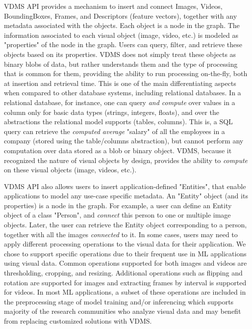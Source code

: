 VDMS API provides a mechanism to insert and connect Images, Videos, BoundingBoxes,
Frames, and Descriptors (feature vectors), together with any metadata
associated with the objects.
Each object is a node in the graph.
The information associated to each visual object (image, video, etc.) is modeled as
"properties" of the node in the graph.
Users can query, filter, and retrieve these objects based on its properties.
VDMS does not simply treat these objects as binary blobs of data, but rather
understands them and the type of processing that is common for them,
providing the ability to run processing on-the-fly, both at insertion and
retrieval time. This is one of the main differentiating aspects when compared to other
database systems, including relational databases.
In a relational database, for instance, one can query \textit{and compute}
over values in a column only for basic data types (strings, integers, floats),
and over the abstractions the relational model supports (tables, columns).
This is, a SQL query can retrieve the \textit{computed average} "salary" of all
the employees in a company (stored using the table/columns abstraction),
but cannot perform any computation over data stored as a blob or binary object.
VDMS, because it recognized the nature of visual objects by design,
provides the ability to \textit{compute} on these visual objects
(image, videos, etc.).

VDMS API also allows users to insert application-defined "Entities",
that enable applications to model any use-case specific metadata.
An "Entity" object (and its properties) is a node in the graph.
For example, a user can define an Entity object of a class "Person",
and \textit{connect} this person to one or multiple image objects.
Later, the user can retrieve the Entity object corresponding to a person,
together with all the images \textit{connected} to it. In some cases,
users may need to apply different processing operations to the visual data
for their application. We chose to support
specific operations due to their frequent use in ML applications using
visual data. Common operations supported for both images and videos are
thresholding, cropping, and resizing. Additional operations such as
flipping and rotation are supported for images and extracting
frames by interval is supported for videos.
In most ML applications, a subset of these operations are included in
the preprocessing stage of model training and/or inferencing which supports
majority of the research communities who analyze visual data and may benefit
from replacing customized solutions with VDMS.

